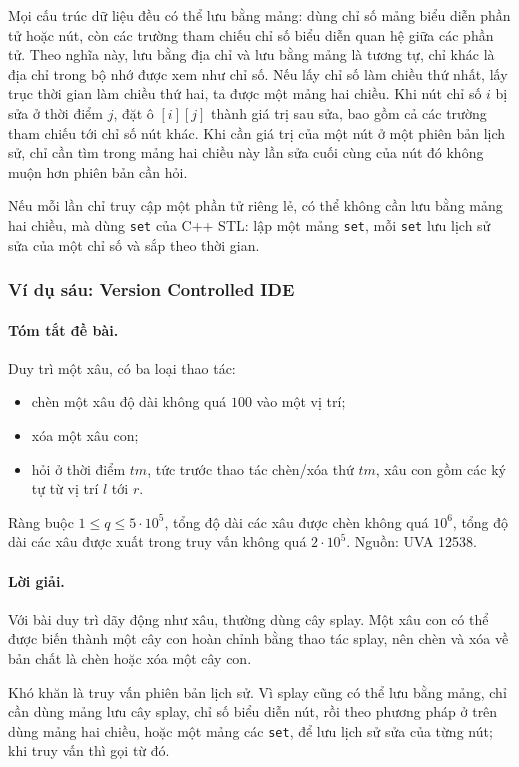 \documentclass[11pt]{article}
\begin{document}
Mọi cấu trúc dữ liệu đều có thể lưu bằng mảng: dùng chỉ số mảng biểu diễn phần
tử hoặc nút, còn các trường tham chiếu chỉ số biểu diễn quan hệ giữa các phần
tử. Theo nghĩa này, lưu bằng địa chỉ và lưu bằng mảng là tương tự, chỉ khác là
địa chỉ trong bộ nhớ được xem như chỉ số. Nếu lấy chỉ số làm chiều thứ nhất,
lấy trục thời gian làm chiều thứ hai, ta được một mảng hai chiều. Khi nút chỉ
số \(i\) bị sửa ở thời điểm \(j\), đặt ô \([i][j]\) thành giá trị sau sửa, bao
gồm cả các trường tham chiếu tới chỉ số nút khác. Khi cần giá trị của một nút
ở một phiên bản lịch sử, chỉ cần tìm trong mảng hai chiều này lần sửa cuối cùng
của nút đó không muộn hơn phiên bản cần hỏi.

Nếu mỗi lần chỉ truy cập một phần tử riêng lẻ, có thể không cần lưu bằng mảng
hai chiều, mà dùng \texttt{set} của C++ STL: lập một mảng \texttt{set}, mỗi
\texttt{set} lưu lịch sử sửa của một chỉ số và sắp theo thời gian.

\subsubsection{Ví dụ sáu: Version Controlled IDE}

\paragraph{Tóm tắt đề bài.}
Duy trì một xâu, có ba loại thao tác:
\begin{itemize}
  \item chèn một xâu độ dài không quá \(100\) vào một vị trí;
  \item xóa một xâu con;
  \item hỏi ở thời điểm \(tm\), tức trước thao tác chèn/xóa thứ \(tm\), xâu
  con gồm các ký tự từ vị trí \(l\) tới \(r\).
\end{itemize}
Ràng buộc \(1\le q\le5\cdot10^5\), tổng độ dài các xâu được chèn không quá
\(10^6\), tổng độ dài các xâu được xuất trong truy vấn không quá \(2\cdot10^5\).
Nguồn: UVA 12538.

\paragraph{Lời giải.}
Với bài duy trì dãy động như xâu, thường dùng cây splay. Một xâu con có thể
được biến thành một cây con hoàn chỉnh bằng thao tác splay, nên chèn và xóa về
bản chất là chèn hoặc xóa một cây con.

Khó khăn là truy vấn phiên bản lịch sử. Vì splay cũng có thể lưu bằng mảng,
chỉ cần dùng mảng lưu cây splay, chỉ số biểu diễn nút, rồi theo phương pháp ở
trên dùng mảng hai chiều, hoặc một mảng các \texttt{set}, để lưu lịch sử sửa
của từng nút; khi truy vấn thì gọi từ đó.
\end{document}
